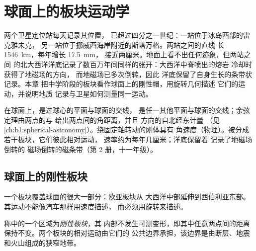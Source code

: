 \chapter{球面上的板块运动学}\label{ch:b1:plate-kinematics}

两个卫星定位站每天记录其位置，
已超过四分之一世纪：一站位于冰岛西部的雷克雅未克，
另一站位于挪威西海岸附近的斯塔万格。两站之间的直线
长 \qty{1546}{km}，每年增长 \qty{17.5}{mm}，
接近两厘米。地面上看不出任何迹象，但两站之间
的北大西洋洋底记录了数百万年间同样的张开：大西洋中脊喷出的熔岩
冷却时获得了地磁场的方向，
而地磁场已多次倒转，因此
洋底保留了自身生长的条带状记录。本章
把中学阶段的板块看作球面上的刚性帽，用旋转几何描述
它们的运动，并说明地质
记录与卫星如何测量同一运动。

\begin{recall}
在球面上，是过球心的平面与球面的交线，
是任一其他平面与球面的交线；余弦定理由两点的与
给出两点间的角距离，并且
方向的自北经东计量
（见\cref{ch:b1:spherical-astronomy}）。绕固定轴转动的刚体具有
角速度（物理）。被分成若干板块，它们彼此相对运动，
速率约为每年几厘米；洋底保留着
记录了地磁场倒转的
磁场倒转的磁条带（第 2 册，十一年级）。
\end{recall}

\section{球面上的刚性板块}

一个板块覆盖球面的很大一部分：欧亚板块从
大西洋中部延伸到西伯利亚东部。其运动不能像汽车那样用速度描述，
而必须用旋转来描述。

\begin{definition}[刚性板块]\label{def:b1:plate-kinematics:rigid-plate}
称中的一个区域为\emph{刚性板块}，其
内部不发生可测变形，即其中任意两点间的距离
保持不变。两个板块的相对运动由它们的
公共边界承担，该边界是由断层、地震和火山组成的狭窄地带。
\end{definition}

